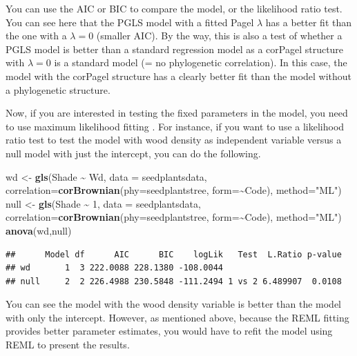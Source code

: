 \documentclass[
]{book}
\newenvironment{Shaded}{\begin{snugshade}}{\end{snugshade}}
\newcommand{\AttributeTok}[1]{\textcolor[rgb]{0.13,0.29,0.53}{#1}}
\newcommand{\DecValTok}[1]{\textcolor[rgb]{0.00,0.00,0.81}{#1}}
\newcommand{\FunctionTok}[1]{\textcolor[rgb]{0.13,0.29,0.53}{\textbf{#1}}}
\newcommand{\NormalTok}[1]{#1}
\newcommand{\OtherTok}[1]{\textcolor[rgb]{0.56,0.35,0.01}{#1}}
\newcommand{\SpecialCharTok}[1]{\textcolor[rgb]{0.81,0.36,0.00}{\textbf{#1}}}
\newcommand{\StringTok}[1]{\textcolor[rgb]{0.31,0.60,0.02}{#1}}
\begin{document}
You can use the AIC or BIC to compare the model, or the likelihood ratio test. You can see here that the PGLS model with a fitted Pagel \(\lambda\) has a better fit than the one with a \(\lambda=0\) (smaller AIC). By the way, this is also a test of whether a PGLS model is better than a standard regression model as a corPagel structure with \(\lambda=0\) is a standard model (= no phylogenetic correlation). In this case, the model with the corPagel structure has a clearly better fit than the model without a phylogenetic structure.

Now, if you are interested in testing the fixed parameters in the model, you need to use maximum likelihood fitting \citep{zuur2009mixed}. For instance, if you want to use a likelihood ratio test to test the model with wood density as independent variable versus a null model with just the intercept, you can do the following.

\begin{Shaded}
\begin{Highlighting}[]
\NormalTok{wd }\OtherTok{\textless{}{-}} \FunctionTok{gls}\NormalTok{(Shade }\SpecialCharTok{\textasciitilde{}}\NormalTok{ Wd, }\AttributeTok{data =}\NormalTok{ seedplantsdata,}
          \AttributeTok{correlation=}\FunctionTok{corBrownian}\NormalTok{(}\AttributeTok{phy=}\NormalTok{seedplantstree, }\AttributeTok{form=}\SpecialCharTok{\textasciitilde{}}\NormalTok{Code), }
          \AttributeTok{method=}\StringTok{"ML"}\NormalTok{)}
\NormalTok{null }\OtherTok{\textless{}{-}} \FunctionTok{gls}\NormalTok{(Shade }\SpecialCharTok{\textasciitilde{}} \DecValTok{1}\NormalTok{, }\AttributeTok{data =}\NormalTok{ seedplantsdata,}
            \AttributeTok{correlation=}\FunctionTok{corBrownian}\NormalTok{(}\AttributeTok{phy=}\NormalTok{seedplantstree, }\AttributeTok{form=}\SpecialCharTok{\textasciitilde{}}\NormalTok{Code), }
            \AttributeTok{method=}\StringTok{"ML"}\NormalTok{)}
\FunctionTok{anova}\NormalTok{(wd,null)}
\end{Highlighting}
\end{Shaded}

\begin{verbatim}
##      Model df      AIC      BIC    logLik   Test  L.Ratio p-value
## wd       1  3 222.0088 228.1380 -108.0044                        
## null     2  2 226.4988 230.5848 -111.2494 1 vs 2 6.489907  0.0108
\end{verbatim}

You can see the model with the wood density variable is better than the model with only the intercept. However, as mentioned above, because the REML fitting provides better parameter estimates, you would have to refit the model using REML to present the results.
\end{document}
